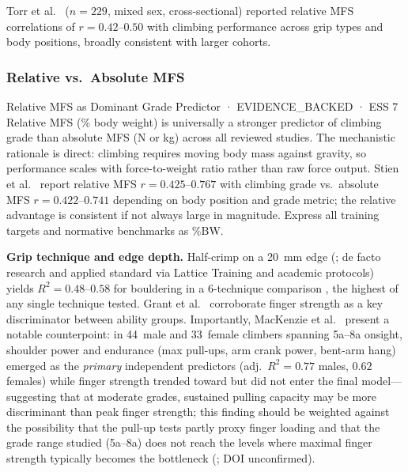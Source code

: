 Torr et al.\ \cite{TEMP_Torr2022} ($n = 229$, mixed sex, cross-sectional) reported relative MFS correlations of $r = 0.42$--$0.50$ with climbing performance across grip types and body positions, broadly consistent with larger cohorts.

\subsubsection{Relative vs.\ Absolute MFS}

\begin{evidencebox}{Relative MFS as Dominant Grade Predictor · EVIDENCE\_BACKED · ESS 7}
Relative MFS (\% body weight) is universally a stronger predictor of climbing grade than absolute MFS (N or kg) across all reviewed studies. The mechanistic rationale is direct: climbing requires moving body mass against gravity, so performance scales with force-to-weight ratio rather than raw force output. Stien et al.\ \cite{TEMP_Stien2025pos} report relative MFS $r = 0.425$--$0.767$ with climbing grade vs.\ absolute MFS $r = 0.422$--$0.741$ depending on body position and grade metric; the relative advantage is consistent if not always large in magnitude. Express all training targets and normative benchmarks as \%BW.
\end{evidencebox}

\medskip
\noindent\textbf{Grip technique and edge depth.} Half-crimp on a 20~mm edge (\toverify; de facto research and applied standard via Lattice Training and academic protocols) yields $R^{2} = 0.48$--$0.58$ for bouldering in a 6-technique comparison \cite{BMK+25}, the highest of any single technique tested. Grant et al.\ \cite{GHWA96} corroborate finger strength as a key discriminator between ability groups. Importantly, MacKenzie et al.\ \cite{TEMP_MacKenzie2020} present a notable counterpoint: in 44~male and 33~female climbers spanning 5a--8a onsight, shoulder power and endurance (max pull-ups, arm crank power, bent-arm hang) emerged as the \emph{primary} independent predictors (adj.\ $R^{2} = 0.77$ males, $0.62$ females) while finger strength trended toward but did not enter the final model---suggesting that at moderate grades, sustained pulling capacity may be more discriminant than peak finger strength; this finding should be weighted against the possibility that the pull-up tests partly proxy finger loading and that the grade range studied (5a--8a) does not reach the levels where maximal finger strength typically becomes the bottleneck (\toverify; DOI unconfirmed).

